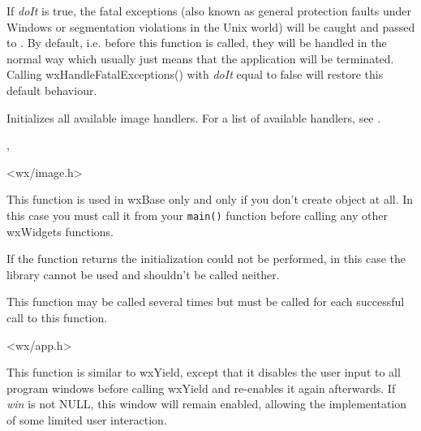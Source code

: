 \label{wxhandlefatalexceptions}


If {\it doIt} is true, the fatal exceptions (also known as general protection
faults under Windows or segmentation violations in the Unix world) will be
caught and passed to .
By default, i.e. before this function is called, they will be handled in the
normal way which usually just means that the application will be terminated.
Calling wxHandleFatalExceptions() with {\it doIt} equal to false will restore
this default behaviour.


\label{wxinitallimagehandlers}


Initializes all available image handlers. For a list of available handlers,
see .


, 


<wx/image.h>


\label{wxinitialize}


This function is used in wxBase only and only if you don't create
 object at all. In this case you must call it from your
{\tt main()} function before calling any other wxWidgets functions.

If the function returns \false the initialization could not be performed,
in this case the library cannot be used and
 shouldn't be called neither.

This function may be called several times but
 must be called for each successful
call to this function.


<wx/app.h>


\label{wxsafeyield}


This function is similar to wxYield, except that it disables the user input to
all program windows before calling wxYield and re-enables it again
afterwards. If {\it win} is not NULL, this window will remain enabled,
allowing the implementation of some limited user interaction.


